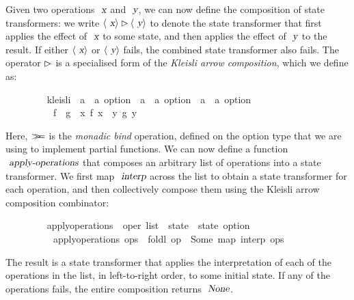 Given two operations $\isa{x}$ and $\isa{y}$, we can now define the composition of state transformers: we write $\langle\isa{x}\rangle \mathbin{\isasymrhd} \langle\isa{y}\rangle$ to denote the state transformer that first applies the effect of $\isa{x}$ to some state, and then applies the effect of $\isa{y}$ to the result.
If either $\langle\isa{x}\rangle$ or $\langle\isa{y}\rangle$ fails, the combined state transformer also fails.
The operator $\emph{$\rhd$}$ is a specialised form of the \emph{Kleisli arrow composition}, which we define as:
\vspace{0.25em}
\begin{isabellebody}
\ \ \ \ \ \ \ \  kleisli\ {\isacharcolon}{\isacharcolon}\ {\isachardoublequoteopen}{\isacharparenleft}{\isacharprime}a\ {\isasymRightarrow}\ {\isacharprime}a\ option{\isacharparenright}\ {\isasymRightarrow}\ {\isacharparenleft}{\isacharprime}a\ {\isasymRightarrow}\ {\isacharprime}a\ option{\isacharparenright}\ {\isasymRightarrow}\ {\isacharparenleft}{\isacharprime}a\ {\isasymRightarrow}\ {\isacharprime}a\ option{\isacharparenright}{\isachardoublequoteclose}\ \isanewline
\ \ \ \ \ \ \ \ \ \ {\isachardoublequoteopen}f\ {\isasymrhd}\ g\ {\isasymequiv}\ {\isasymlambda}x{\isachardot}\ f\ x\ {\isasymbind}\ {\isacharparenleft}{\isasymlambda}y{\isachardot}\ g\ y{\isacharparenright}{\isachardoublequoteclose}
\end{isabellebody}
\vspace{0.25em}
\noindent Here, $\emph{$\mathbin{>\!\!\!>\mkern-6.7mu=}$}$ is the \emph{monadic bind} operation, defined on the option type that we are using to implement partial functions.
We can now define a function $\isa{apply-operations}$ that composes an arbitrary list of operations into a state transformer.
We first map $\isa{interp}$ across the list to obtain a state transformer for each operation, and then collectively compose them using the Kleisli arrow composition combinator:
\vspace{0.25em}
\begin{isabellebody}
\ \ \ \ \ \ \ \  apply{\isacharunderscore}operations\ {\isacharcolon}{\isacharcolon}\ {\isachardoublequoteopen}{\isacharprime}oper\ list\ {\isasymRightarrow}\ {\isacharprime}state\ {\isasymRightarrow}\ {\isacharprime}state\ option{\isachardoublequoteclose}\ \isanewline
\ \ \ \ \ \ \ \ \ \ {\isachardoublequoteopen}apply{\isacharunderscore}operations\ ops\ {\isasymequiv}\ foldl\ {\isacharparenleft}op\ {\isasymrhd}{\isacharparenright}\ Some\ {\isacharparenleft}map\ interp\ ops{\isacharparenright}{\isachardoublequoteclose}
\end{isabellebody}
\vspace{0.25em}
\noindent The result is a state transformer that applies the interpretation of each of the operations in the list, in left-to-right order, to some initial state.
If any of the operations fails, the entire composition returns $\isa{None}$.

